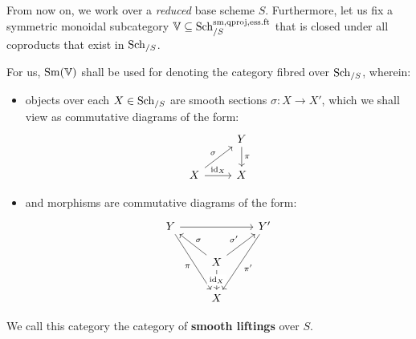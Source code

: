                 \begin{convention}
                    From now on, we work over a \textit{reduced} base scheme $S$. Furthermore, let us fix a symmetric monoidal subcategory $\mathbb{V} \subseteq \mathrm{Sch}_{/S}^{\mathrm{sm}, \mathrm{qproj}, \mathrm{ess}.\mathrm{ft}}$ that is closed under all coproducts that exist in $\mathrm{Sch}_{/S}$. 
                \end{convention}
                
                \begin{definition} \label{def: category_of_smooth_sections}
                    For us, $\mathrm{Sm}(\mathbb{V})$ shall be used for denoting the category fibred over $\mathrm{Sch}_{/S}$, wherein:
                        \begin{itemize}
                            \item objects over each $X \in \mathrm{Sch}_{/S}$ are smooth sections $\sigma: X \to X'$, which we shall view as commutative diagrams of the form:
                                $$
                                    \begin{tikzcd}
                                    	& {Y} \\
                                    	X & X
                                    	\arrow["\pi", from=1-2, to=2-2]
                                    	\arrow["{\sigma}", from=2-1, to=1-2]
                                    	\arrow["{\id_X}", from=2-1, to=2-2]
                                    \end{tikzcd}
                                $$
                            \item and morphisms are commutative diagrams of the form:
                                $$
                                    \begin{tikzcd}
                                    	Y && {Y'} \\
                                    	& X \\
                                    	& X
                                    	\arrow["\pi"', from=1-1, to=3-2]
                                    	\arrow["\sigma"', from=2-2, to=1-1]
                                    	\arrow["{\id_X}"{description}, from=2-2, to=3-2]
                                    	\arrow[from=1-1, to=1-3]
                                    	\arrow["{\sigma'}", from=2-2, to=1-3]
                                    	\arrow["{\pi'}", from=1-3, to=3-2]
                                    \end{tikzcd}
                                $$
                        \end{itemize}
                    We call this category the category of \textbf{smooth liftings} over $S$.
                \end{definition}
        
